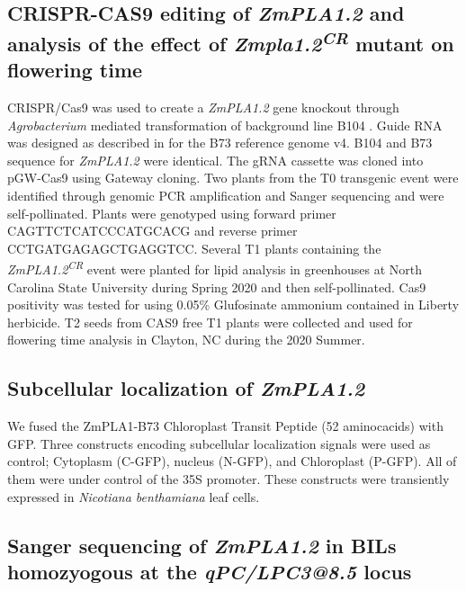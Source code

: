 \documentclass[9pt,twocolumn,twoside,lineno]{BioRxiv}
\begin{document}
\subsection{CRISPR-CAS9 editing of \textit{ZmPLA1.2} and analysis of the effect of \textit{Zmpla1.2\textsuperscript{CR}} mutant on flowering time}

CRISPR/Cas9 was used to create a \textit{ZmPLA1.2} gene knockout through \textit{Agrobacterium} mediated transformation of background line B104 \cite{Wu2020-nq, Char2017-uk}. 
Guide RNA was designed as described in \cite{Brazelton2015-co} for the B73 reference genome v4. 
B104 and B73 sequence for \textit{ZmPLA1.2} were identical. 
The gRNA cassette was cloned into pGW-Cas9 using Gateway cloning. 
Two plants from the T0 transgenic event were identified through genomic PCR amplification and Sanger sequencing and were self-pollinated. 
Plants were genotyped using forward primer CAGTTCTCATCCCATGCACG and reverse primer CCTGATGAGAGCTGAGGTCC.
Several T1 plants containing the \textit{ZmPLA1.2\textsuperscript{CR}} event were  planted for lipid analysis in greenhouses at  North Carolina State University during Spring 2020 and then self-pollinated. 
Cas9 positivity was tested for using 0.05\% Glufosinate ammonium contained in Liberty herbicide. 
T2 seeds from CAS9 free T1 plants were collected and used for flowering time analysis in  Clayton, NC during the 2020 Summer.  %

\subsection{Subcellular localization of \textit{ZmPLA1.2}}

We fused the ZmPLA1-B73 Chloroplast Transit Peptide (52 aminocacids) with GFP. %
Three constructs encoding subcellular localization signals were used as control; Cytoplasm (C-GFP), nucleus (N-GFP), and Chloroplast (P-GFP). 
All of them were under control of the 35S promoter. 
These constructs were transiently expressed in \textit{Nicotiana benthamiana} leaf cells.

\subsection{Sanger sequencing of \textit{ZmPLA1.2} in BILs homozyogous at the \textit{qPC/LPC3@8.5} locus}
\end{document}
